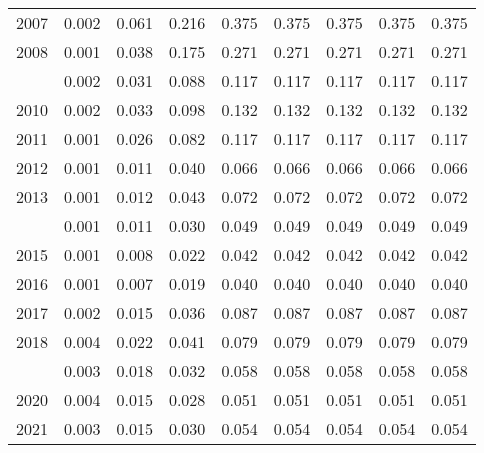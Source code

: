 \documentclass[
]{article}
\begin{document}
\begin{longtable}[t]{lrrrrrrrr}
2007 & 0.002 & 0.061 & 0.216 & 0.375 & 0.375 & 0.375 & 0.375 & 0.375\\
2008 & 0.001 & 0.038 & 0.175 & 0.271 & 0.271 & 0.271 & 0.271 & 0.271\\
\addlinespace
2009 & 0.002 & 0.031 & 0.088 & 0.117 & 0.117 & 0.117 & 0.117 & 0.117\\
2010 & 0.002 & 0.033 & 0.098 & 0.132 & 0.132 & 0.132 & 0.132 & 0.132\\
2011 & 0.001 & 0.026 & 0.082 & 0.117 & 0.117 & 0.117 & 0.117 & 0.117\\
2012 & 0.001 & 0.011 & 0.040 & 0.066 & 0.066 & 0.066 & 0.066 & 0.066\\
2013 & 0.001 & 0.012 & 0.043 & 0.072 & 0.072 & 0.072 & 0.072 & 0.072\\
\addlinespace
2014 & 0.001 & 0.011 & 0.030 & 0.049 & 0.049 & 0.049 & 0.049 & 0.049\\
2015 & 0.001 & 0.008 & 0.022 & 0.042 & 0.042 & 0.042 & 0.042 & 0.042\\
2016 & 0.001 & 0.007 & 0.019 & 0.040 & 0.040 & 0.040 & 0.040 & 0.040\\
2017 & 0.002 & 0.015 & 0.036 & 0.087 & 0.087 & 0.087 & 0.087 & 0.087\\
2018 & 0.004 & 0.022 & 0.041 & 0.079 & 0.079 & 0.079 & 0.079 & 0.079\\
\addlinespace
2019 & 0.003 & 0.018 & 0.032 & 0.058 & 0.058 & 0.058 & 0.058 & 0.058\\
2020 & 0.004 & 0.015 & 0.028 & 0.051 & 0.051 & 0.051 & 0.051 & 0.051\\
2021 & 0.003 & 0.015 & 0.030 & 0.054 & 0.054 & 0.054 & 0.054 & 0.054\\*
\end{longtable}
\end{document}
